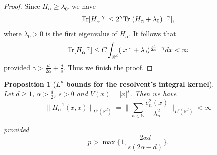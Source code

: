 \documentclass[%
11pt,  reqno]{amsart}
\newtheorem{proposition}[theorem]{Proposition}
\theoremstyle{remarkstyle}
\newcommand{\1}{\hspace{0.2mm}\text{I}\hspace{0.2mm}}
\newcommand{\noi}{\noindent}
\newcommand{\R}{\mathbb{R}}
\newcommand{\al}{\alpha}
\newcommand{\g}{\gamma}
\newcommand{\ld}{\lambda}
\newcommand{\N}{\mathbb{N}}
\numberwithin{equation}{section}
\numberwithin{theorem}{section}
\begin{document}
\begin{proof}
		Since $H_\al \ge \ld_0$, we have
		$$
		{\rm Tr}[H_\al^{-\g}] \leq 2^\g {\rm Tr}[(H_\al +\ld_0)^{-\g}],
		$$
		where $\ld_0>0$ is the first eigenvalue of $H_\al$. It follows that
		$$
		{\rm Tr}[H_\al^{-\g}] \leq C \int_{\R^d} (|x|^s + \ld_0)^{\frac{d}{2\al}-\g} dx <\infty
		$$
		provided $\g >\frac{d}{2\al} +\frac{d}{s}$. Thus we finish the proof.
	\end{proof}
	
	
	
	
	
	
	
	\begin{proposition}[\bf $L^p$ bounds for the resolvent's integral kernel] 
		\label{PROP:GreenLp} \mbox{} \\
		Let $d\ge 1$, $\al>\frac{d}{2}$, $s>0$ and $V(x) = |x|^s$.
		Then we have 
		\[
		\|H^{-1}_\al (x,x)\|_{L^p(\R^d)} = \bigg\|\sum_{n\in \N} \frac{e^2_n(x)}{\ld_n^2} \bigg\|_{L^p(\R^d)} < \infty
		\]
		
		\noi 
		provided 
		\[
		p > \max \bigg\{1, \frac{2\al d}{s(2\al - d)} \bigg\}.
		\]
	\end{proposition}
	
\end{document}
